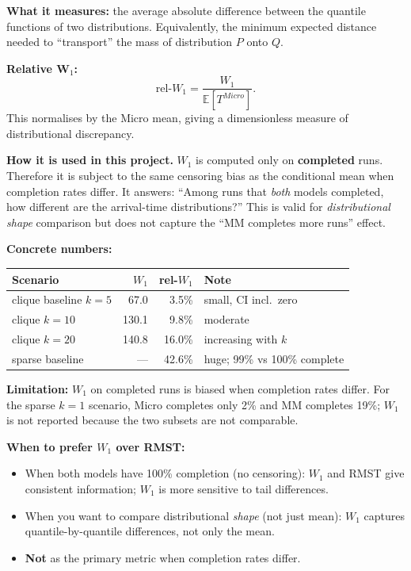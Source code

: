 \documentclass[11pt,a4paper]{article}
\begin{document}
\textbf{What it measures:} the average absolute difference between the quantile
functions of two distributions.  Equivalently, the minimum expected distance
needed to ``transport'' the mass of distribution $P$ onto $Q$.

\textbf{Relative W$_1$:}
\[
  \mathrm{rel}\text{-}W_1 = \frac{W_1}{\mathbb{E}[T^{Micro}]}.
\]
This normalises by the Micro mean, giving a dimensionless measure of
distributional discrepancy.

\textbf{How it is used in this project.}
$W_1$ is computed only on \textbf{completed} runs.  Therefore it is subject
to the same censoring bias as the conditional mean when completion rates
differ.  It answers: ``Among runs that \emph{both} models completed, how
different are the arrival-time distributions?''  This is valid for
\emph{distributional shape} comparison but does not capture the
``MM completes more runs'' effect.

\textbf{Concrete numbers:}
\begin{center}
\begin{tabular}{lrrl}
\toprule
Scenario & $W_1$ & rel-$W_1$ & Note \\
\midrule
clique baseline $k=5$ & 67.0 & 3.5\% & small, CI incl.\ zero \\
clique $k=10$         & 130.1 & 9.8\% & moderate \\
clique $k=20$         & 140.8 & 16.0\% & increasing with $k$ \\
sparse baseline       & ---  & 42.6\% & huge; 99\% vs 100\% complete \\
\bottomrule
\end{tabular}
\end{center}

\textbf{Limitation:} $W_1$ on completed runs is biased when completion rates
differ.  For the sparse $k=1$ scenario, Micro completes only 2\% and MM
completes 19\%; $W_1$ is not reported because the two subsets are not
comparable.

\textbf{When to prefer $W_1$ over RMST:}
\begin{itemize}
  \item When both models have 100\% completion (no censoring): $W_1$ and RMST
        give consistent information; $W_1$ is more sensitive to tail differences.
  \item When you want to compare distributional \emph{shape} (not just mean):
        $W_1$ captures quantile-by-quantile differences, not only the mean.
  \item \textbf{Not} as the primary metric when completion rates differ.
\end{itemize}
\end{document}
